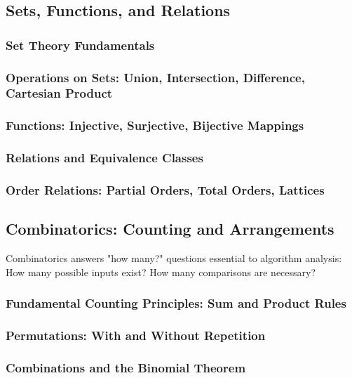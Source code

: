\subsection{Sets, Functions, and Relations}
\label{subsec:sets-functions-relations}

\subsubsection{Set Theory Fundamentals}
\subsubsection{Operations on Sets: Union, Intersection, Difference, Cartesian Product}
\subsubsection{Functions: Injective, Surjective, Bijective Mappings}
\subsubsection{Relations and Equivalence Classes}
\subsubsection{Order Relations: Partial Orders, Total Orders, Lattices}

\subsection{Combinatorics: Counting and Arrangements}
\label{subsec:combinatorics}

\begin{subsectionintro}
Combinatorics answers "how many?" questions essential to algorithm analysis:
How many possible inputs exist? How many comparisons are necessary?
\end{subsectionintro}

\subsubsection{Fundamental Counting Principles: Sum and Product Rules}
\subsubsection{Permutations: With and Without Repetition}
\subsubsection{Combinations and the Binomial Theorem}
